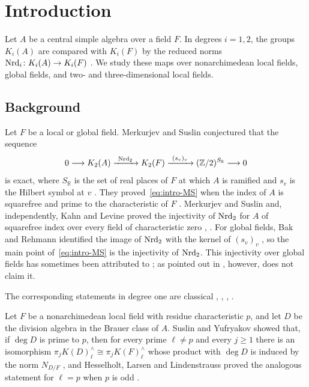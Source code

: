 \section*{Introduction}

Let $A$ be a central simple algebra over a field $F$.
In degrees $i=1,2$, the groups $K_i(A)$ are compared with $K_i(F)$ by the reduced norms $\operatorname{Nrd}_i\colon K_i(A)\to K_i(F)$ \cite{MerkurjevSuslin1982,Suslin1987}.
We study these maps over nonarchimedean local fields, global fields, and two- and three-dimensional local fields.


\subsection*{Background}

Let $F$ be a local or global field.
Merkurjev and Suslin conjectured that the sequence
\begin{equation}\label{eq:intro-MS}
 0\longrightarrow K_2(A)\xrightarrow{\ \operatorname{Nrd}_2\ }K_2(F)
 \xrightarrow{\ (s_v)_{v}\ }(\mathbb Z/2)^{S_{\mathbb R}}\longrightarrow0
\end{equation}
is exact, where $S_{\mathbb R}$ is the set of real places of $F$ at which $A$ is ramified and $s_v$ is the Hilbert symbol at $v$ \cite[Remark 17.5]{MerkurjevSuslin1982}.
They proved~\eqref{eq:intro-MS} when the index of $A$ is squarefree and prime to the characteristic of $F$ \cite[Theorem 17.4]{MerkurjevSuslin1982}.
Merkurjev and Suslin and, independently, Kahn and Levine proved the injectivity of $\operatorname{Nrd}_2$ for $A$ of squarefree index over every field of characteristic zero \cite[Theorem 2.3]{MerkurjevSuslin2010}, \cite[Corollary 2]{KahnLevine2010}.
For global fields, Bak and Rehmann identified the image of $\operatorname{Nrd}_2$ with the kernel of $(s_v)_v$ \cite[\S2, Theorem 3]{BakRehmann1984}, so the main point of~\eqref{eq:intro-MS} is the injectivity of $\operatorname{Nrd}_2$.
This injectivity over global fields has sometimes been attributed to \cite{BakRehmann1984}; as pointed out in \cite[Remark 10.4(3)]{BHRAdeles}, however, \cite{BakRehmann1984} does not claim it.

The corresponding statements in degree one are classical \cite{NakayamaMatsushima1943,Wang1950}, \cite[Corollary 4.10(iii)]{HazratWadsworth}, \cite[Theorem 33.15]{ReinerMaximalOrders}, \cite[Corollary 2]{Yanchevskii1975}.


Let $F$ be a nonarchimedean local field with residue characteristic $p$, and let $D$ be the division algebra in the Brauer class of $A$.
Suslin and Yufryakov showed that, if $\deg D$ is prime to $p$, then for every prime $\ell\ne p$ and every $j\ge1$ there is an isomorphism $\pi_jK(D)^\wedge_\ell\cong\pi_jK(F)^\wedge_\ell$ whose product with $\deg D$ is induced by the norm $N_{D/F}$ \cite[Theorem 3]{SuslinYufryakov}, and Hesselholt, Larsen and Lindenstrauss proved the analogous statement for $\ell=p$ when $p$ is odd \cite[Theorem A]{HesselholtLarsenLindenstrauss2020}.

